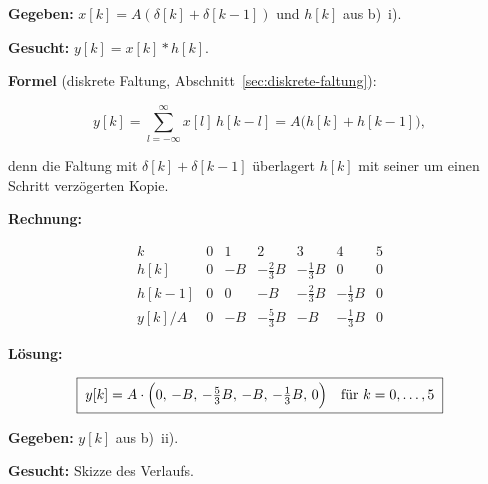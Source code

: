 \begin{beispiel}[b) ii) Faltung y = x * h]

\textbf{Gegeben:} $x[k]=A(\delta[k]+\delta[k-1])$ und $h[k]$ aus b)~i).

\textbf{Gesucht:} $y[k]=x[k]*h[k]$.

\textbf{Formel} (diskrete Faltung, Abschnitt~\ref{sec:diskrete-faltung}):

$$
y[k] = \sum_{l=-\infty}^{\infty} x[l]\,h[k-l]
     = A\bigl(h[k]+h[k-1]\bigr),
$$

denn die Faltung mit $\delta[k]+\delta[k-1]$ überlagert $h[k]$ mit seiner
um einen Schritt verzögerten Kopie.

\textbf{Rechnung:}

$$
\begin{array}{c|ccccccc}
k        & 0 & 1  & 2            & 3   & 4            & 5 \\\hline
h[k]     & 0 & -B & -\tfrac23 B  & -\tfrac13 B & 0 & 0 \\
h[k-1]   & 0 & 0  & -B           & -\tfrac23 B & -\tfrac13 B & 0 \\\hline
y[k]/A   & 0 & -B & -\tfrac53 B  & -B  & -\tfrac13 B  & 0
\end{array}
$$

\textbf{Lösung:}

$$
\boxed{\;
y[k] = A\cdot\Bigl(0,\,-B,\,-\tfrac{5}{3}B,\,-B,\,-\tfrac{1}{3}B,\,0\Bigr)
\quad\text{für } k=0,\dots,5
\;}
$$

\end{beispiel}

\begin{beispiel}

\textbf{Gegeben:} $y[k]$ aus b)~ii).

\textbf{Gesucht:} Skizze des Verlaufs.

\begin{center}
\end{center}

\end{beispiel}


